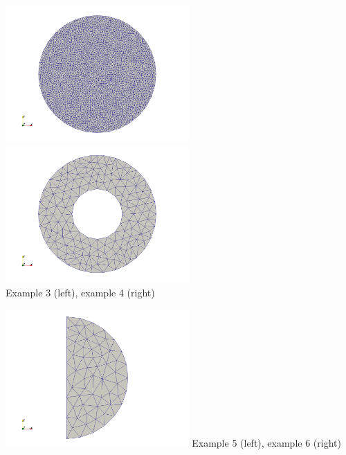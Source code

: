 \begin{center}
\includegraphics[width=7cm]{python_codes/fieldstone_131/example3/example3}
\includegraphics[width=7cm]{python_codes/fieldstone_131/example4/example4}\\
{\captionfont Example 3 (left), example 4 (right)}
\end{center}

\begin{center}
\includegraphics[width=7cm]{python_codes/fieldstone_131/example5/example5}
{\captionfont Example 5 (left), example 6 (right)}
\end{center}
